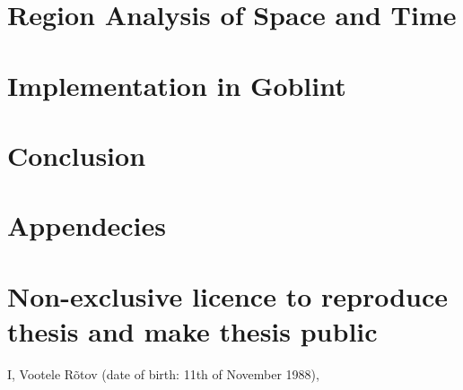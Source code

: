 \documentclass{style/master-thesis}
\begin{document}
\section{Region Analysis of Space and Time}
\label{sec:region}


\pagebreak


\section{Implementation in Goblint}
\label{sec:goblint}
%



\pagebreak


\clearpage
\section{Conclusion} 



\newpage

{}


\newpage

\appendix
\section*{Appendecies}
\renewcommand{\thesubsection}{\Alph{subsection}}

\pagebreak
\section*{\small Non-exclusive licence to reproduce thesis and make thesis public}


I, Vootele Rõtov (date of birth: 11th of November 1988),
\end{document}
